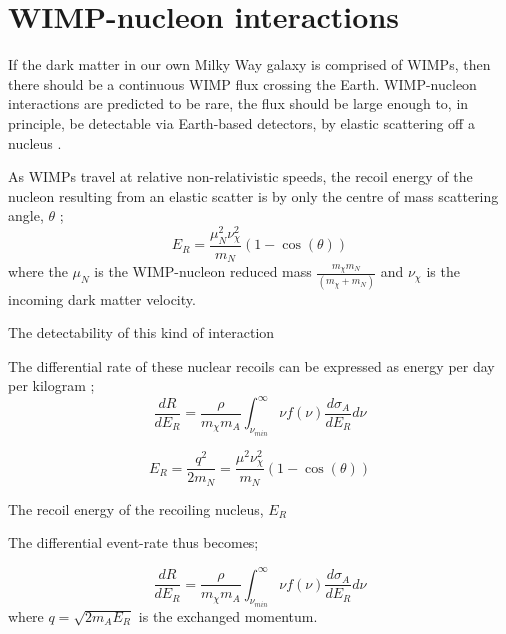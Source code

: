 \section{WIMP-nucleon interactions} \label{sec:wimp_nucleus_interactions}
\par
If the dark matter in our own Milky Way galaxy is comprised of WIMPs, then there should be a continuous WIMP flux crossing the Earth.
WIMP-nucleon interactions are predicted to be rare, the flux should be large enough to, in principle, be detectable via Earth-based detectors, by elastic scattering off a nucleus \cite{wimp_nucleon_interactions_first_suggestion_ref,supersymmetric_dark_matter_ref}.

As WIMPs travel at relative non-relativistic speeds, the recoil energy of the nucleon resulting from an elastic scatter is by only the centre of mass scattering angle, $\theta$ \cite{direct_detection_of_wimps_ref};
\begin{equation}
    E_{R} = \frac{{\mu}_{N}^{2}\nu_{\chi}^2}{m_{N}}(1-\cos(\theta))
\end{equation}
where the $\mu_N$ is the WIMP-nucleon reduced mass $\frac{m_\chi m_N}{(m_\chi + m_N)}$ and $\nu_\chi$ is the incoming dark matter velocity.

\par
The detectability of this kind of interaction
\par
The differential rate of these nuclear recoils can be expressed as energy per day per kilogram \cite{direct_detection_of_wimps_ref};
\begin{equation}
    \frac{dR}{dE_{R}} = \frac{\rho}{m_{\chi}m_{A}} \int_{\nu_{min}}^{\infty} \nu f(\nu) \frac{d\sigma_{A}}{dE_{R}} d\nu
\end{equation}


\begin{equation}
    E_{R} = \frac{q^{2}}{2m_{N}} = \frac{\mu^2\nu_{\chi}^2}{m_{N}}(1-\cos(\theta))
\end{equation}

The recoil energy of the recoiling nucleus, $E_{R}$




\par
The differential event-rate thus becomes;

\begin{equation}
    \frac{dR}{dE_{R}} = \frac{\rho}{m_{\chi}m_{A}} \int_{\nu_{min}}^{\infty} \nu f(\nu) \frac{d\sigma_{A}}{dE_{R}} d\nu
\end{equation}
where $q=\sqrt{2{m}_{A}E_{R}}$ is the exchanged momentum.


